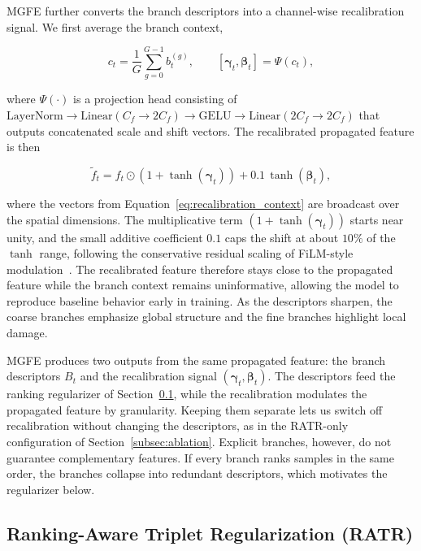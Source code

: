 \documentclass[symmetry,article,submit,pdftex,moreauthors]{Definitions/mdpi}
\begin{document}
MGFE further converts the branch descriptors into a channel-wise recalibration signal. We first average the branch context,

\begin{equation}
c_t = \frac{1}{G}\sum_{g=0}^{G-1}b_t^{(g)},
\qquad
[\boldsymbol{\gamma}_t,\boldsymbol{\beta}_t] = \Psi(c_t),
\label{eq:recalibration_context}
\end{equation}

where $\Psi(\cdot)$ is a projection head consisting of $\mathrm{LayerNorm}\!\rightarrow\!\mathrm{Linear}(C_f\!\rightarrow\!2C_f)\!\rightarrow\!\mathrm{GELU}\!\rightarrow\!\mathrm{Linear}(2C_f\!\rightarrow\!2C_f)$ that outputs concatenated scale and shift vectors. The recalibrated propagated feature is then

\begin{equation}
\widetilde{f}_t =
f_t \odot
\left(1+\tanh(\boldsymbol{\gamma}_t)\right)
+ 0.1\,\tanh(\boldsymbol{\beta}_t),
\label{eq:recalibration}
\end{equation}

where the vectors from Equation~\eqref{eq:recalibration_context} are broadcast over the spatial dimensions. The multiplicative term $(1+\tanh(\boldsymbol{\gamma}_t))$ starts near unity, and the small additive coefficient $0.1$ caps the shift at about $10\%$ of the $\tanh$ range, following the conservative residual scaling of FiLM-style modulation~\cite{perez2018film}. The recalibrated feature therefore stays close to the propagated feature while the branch context remains uninformative, allowing the model to reproduce baseline behavior early in training. As the descriptors sharpen, the coarse branches emphasize global structure and the fine branches highlight local damage.

MGFE produces two outputs from the same propagated feature: the branch descriptors $B_t$ and the recalibration signal $(\boldsymbol{\gamma}_t, \boldsymbol{\beta}_t)$. The descriptors feed the ranking regularizer of Section~\ref{subsec:ratr}, while the recalibration modulates the propagated feature by granularity. Keeping them separate lets us switch off recalibration without changing the descriptors, as in the RATR-only configuration of Section~\ref{subsec:ablation}. Explicit branches, however, do not guarantee complementary features. If every branch ranks samples in the same order, the branches collapse into redundant descriptors, which motivates the regularizer below.

\subsection{Ranking-Aware Triplet Regularization (RATR)}
\label{subsec:ratr}
\end{document}
